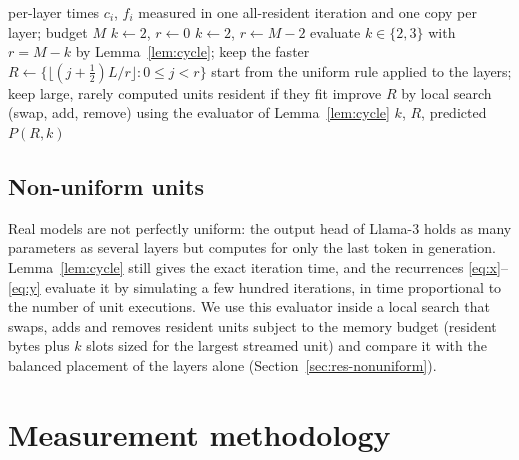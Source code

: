 \documentclass[final,5p,times,twocolumn]{elsarticle}
\theoremstyle{definition}
\newcommand{\Res}{R}
\newcommand{\per}{P}
\begin{document}
\begin{algorithm}[t]
\caption{Choosing slots and resident layers for a memory budget of $M$ layers.}
\label{alg:place}
\small
\begin{algorithmic}[1]
\Require per-layer times $c_i$, $f_i$ measured in one all-resident iteration and one copy per layer; budget $M$
   \State $k\gets 2$, $r\gets 0$ 
   \State $k\gets 2$, $r\gets M-2$ 
  \Else \State evaluate $k\in\{2,3\}$ with $r=M-k$ by Lemma~\ref{lem:cycle}; keep the faster 
  \EndIf
  \State $\Res\gets\{\lfloor (j+\frac12)L/r\rfloor : 0\le j<r\}$ 
\Else
  \State start from the uniform rule applied to the layers; keep large, rarely computed units resident if they fit
  \State improve $\Res$ by local search (swap, add, remove) using the evaluator of Lemma~\ref{lem:cycle}
\EndIf
\State \Return $k$, $\Res$, predicted $\per(\Res,k)$
\end{algorithmic}
\end{algorithm}

\subsection{Non-uniform units}
\label{sec:nonuniform}

Real models are not perfectly uniform: the output head of Llama-3 holds as many parameters as several layers but computes for only the last token in generation. Lemma~\ref{lem:cycle} still gives the exact iteration time, and the recurrences \eqref{eq:x}--\eqref{eq:y} evaluate it by simulating a few hundred iterations, in time proportional to the number of unit executions. We use this evaluator inside a local search that swaps, adds and removes resident units subject to the memory budget (resident bytes plus $k$ slots sized for the largest streamed unit) and compare it with the balanced placement of the layers alone (Section~\ref{sec:res-nonuniform}).

\section{Measurement methodology}
\label{sec:method}



\end{document}
